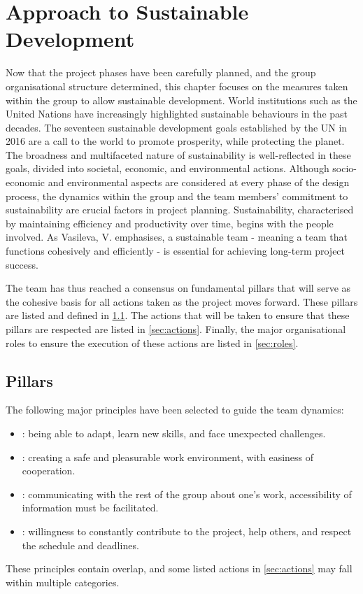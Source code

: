 \chapter[Sustainability]{Approach to Sustainable Development}\label{ch:sustainability}
Now that the project phases have been carefully planned, and the group organisational structure determined, this chapter focuses on the measures taken within the group to allow sustainable development. 
World institutions such as the United Nations have increasingly highlighted sustainable behaviours in the past decades.
The seventeen sustainable development goals established by the UN in 2016 are a call to the world to promote prosperity, while protecting the planet.
The broadness and multifaceted nature of sustainability is well-reflected in these goals, divided into societal, economic, and environmental actions.
Although socio-economic and environmental aspects are considered at every phase of the design process, the dynamics within the group and the team members' commitment to sustainability are crucial factors in project planning.
Sustainability, characterised by maintaining efficiency and productivity over time, begins with the people involved.
As Vasileva, V. \cite{SustainableTeam} emphasises, a sustainable team - meaning a team that functions cohesively and efficiently - is essential for achieving long-term project success.

The team has thus reached a consensus on fundamental pillars that will serve as the cohesive basis for all actions taken as the project moves forward.
These pillars are listed and defined in \cref{sec:pillars}.
The actions that will be taken to ensure that these pillars are respected are listed in \cref{sec:actions}.
Finally, the major organisational roles to ensure the execution of these actions are listed in \cref{sec:roles}.


\section{Pillars}\label{sec:pillars}
The following major principles have been selected to guide the team dynamics:
\begin{itemize}
    \item {}: being able to adapt, learn new skills, and face unexpected challenges.
    \item {}: creating a safe and pleasurable work environment, with easiness of cooperation.
    \item {}: communicating with the rest of the group about one's work, accessibility of information must be facilitated.
    \item {}: willingness to constantly contribute to the project, help others, and respect the schedule and deadlines.
\end{itemize}
These principles contain overlap, and some listed actions in \cref{sec:actions} may fall within multiple categories.


